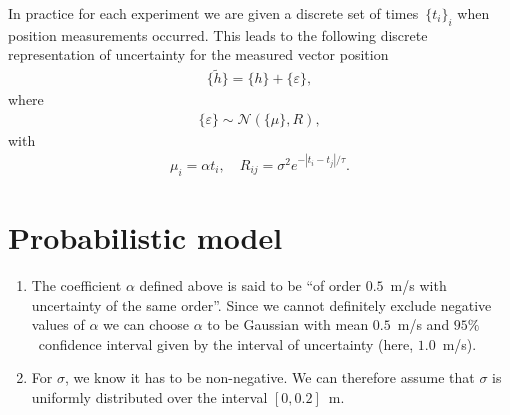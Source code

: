 \documentclass{article}
\begin{document}
In practice for each experiment we are given a discrete set of times~$\{ t_i \}_i$ when position measurements occurred. This leads to the following discrete representation of uncertainty for the measured vector position
\begin{align*}
 \{ \tilde{h} \} = \{ h \} + \{ \varepsilon \},
\end{align*}
where
\begin{align*}
 \{ \varepsilon \} \sim \mathcal{N}\left( \{ \mu \} ,  R  \right),
\end{align*}
with
\begin{align*}
 \mu_i = \alpha t_i, \quad R_{ij} = \sigma^2 e^{-|t_i-t_j|/\tau}.
\end{align*}

\section{Probabilistic model}


\begin{enumerate}
 \item The coefficient $\alpha$ defined above is said to be ``of order $0.5$~m/s with uncertainty of the same order''. Since we cannot definitely exclude negative values of $\alpha$ we can choose $\alpha$ to be Gaussian with mean $0.5$~m/s and $95\%$~confidence interval given by the interval of uncertainty (here, $1.0$~m/s).
 \item For $\sigma$, we know it has to be non-negative. We can therefore assume that $\sigma$ is uniformly distributed over the interval $[0, 0.2]$~m.
\end{enumerate}
\end{document}
